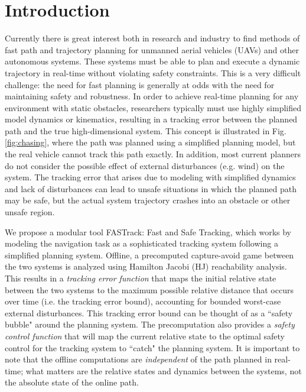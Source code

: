 \section{Introduction}
 Currently there is great interest both in research and industry to find methods of fast path and trajectory planning for unmanned aerial vehicles (UAVs) and other autonomous systems. These systems must be able to plan and execute a dynamic trajectory in real-time without violating safety constraints. This is a very difficult challenge: the need for fast planning is generally at odds with the need for maintaining safety and robustness. In order to achieve real-time planning for any environment with static obstacles, researchers typically must use highly simplified model dynamics or kinematics, resulting in a tracking error between the planned path and the true high-dimensional system. This concept is illustrated in Fig. \ref{fig:chasing}, where the path was planned using a simplified planning model, but the real vehicle cannot track this path exactly. In addition, most current planners do not consider the possible effect of external disturbances (e.g. wind) on the system. The tracking error that arises due to modeling with simplified dynamics and lack of disturbances can lead to unsafe situations in which the planned path may be safe, but the actual system trajectory crashes into an obstacle or other unsafe region.

We propose a modular tool FASTrack: Fast and Safe Tracking, which works by modeling the navigation task as a sophisticated tracking system following a simplified planning system. Offline, a precomputed capture-avoid game between the two systems is analyzed using Hamilton Jacobi (HJ) reachability analysis. This results in a \textit{tracking error function} that maps the initial relative state between the two systems to the maximum possible relative distance that occurs over time (i.e. the tracking error bound), accounting for bounded worst-case external disturbances. This tracking error bound can be thought of as a ``safety bubble" around the planning system. The precomputation also provides a \textit{safety control function} that will map the current relative state to the optimal safety control for the tracking system to ``catch" the planning system. It is important to note that the offline computations are \textit{independent} of the path planned in real-time; what matters are the relative states and dynamics between the systems, not the absolute state of the online path.

